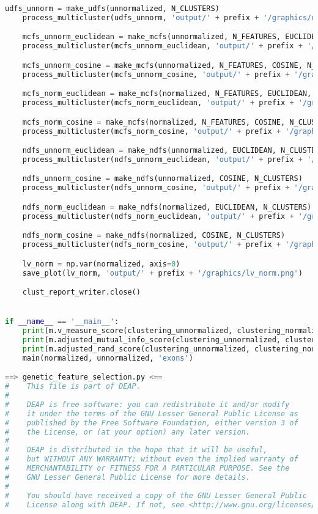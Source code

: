 \begin{lstlisting}[columns=fullflexible,language=Python]
    udfs_unnorm = make_udfs(unnormalized, N_CLUSTERS)
    process_multicluster(udfs_unnorm, 'output/' + prefix + '/graphics/udfs_unnorm_1c.png')

    mcfs_unnorm_euclidean = make_mcfs(unnormalized, N_FEATURES, EUCLIDEAN, N_CLUSTERS)
    process_multicluster(mcfs_unnorm_euclidean, 'output/' + prefix + '/graphics/mcfs_unnorm_euclidean_1c.png')

    mcfs_unnorm_cosine = make_mcfs(unnormalized, N_FEATURES, COSINE, N_CLUSTERS)
    process_multicluster(mcfs_unnorm_cosine, 'output/' + prefix + '/graphics/mcfs_unnorm_cosine_1c.png')

    mcfs_norm_euclidean = make_mcfs(normalized, N_FEATURES, EUCLIDEAN, N_CLUSTERS)
    process_multicluster(mcfs_norm_euclidean, 'output/' + prefix + '/graphics/mcfs_norm_euclidean_1c.png')

    mcfs_norm_cosine = make_mcfs(normalized, N_FEATURES, COSINE, N_CLUSTERS)
    process_multicluster(mcfs_norm_cosine, 'output/' + prefix + '/graphics/mcfs_norm_cosine_1c.png')

    ndfs_unnorm_euclidean = make_ndfs(unnormalized, EUCLIDEAN, N_CLUSTERS)
    process_multicluster(ndfs_unnorm_euclidean, 'output/' + prefix + '/graphics/ndfs_unnorm_euclidean_1c.png')

    ndfs_unnorm_cosine = make_ndfs(unnormalized, COSINE, N_CLUSTERS)
    process_multicluster(ndfs_unnorm_cosine, 'output/' + prefix + '/graphics/ndfs_unnorm_cosine_1c.')

    ndfs_norm_euclidean = make_ndfs(normalized, EUCLIDEAN, N_CLUSTERS)
    process_multicluster(ndfs_norm_euclidean, 'output/' + prefix + '/graphics/ndfs_norm_euclidean_1c.png')

    ndfs_norm_cosine = make_ndfs(normalized, COSINE, N_CLUSTERS)
    process_multicluster(ndfs_norm_cosine, 'output/' + prefix + '/graphics/ndfs_norm_cosine_1c.png')

    lv_norm = np.var(normalized, axis=0)
    save_plot(lv_norm, 'output/' + prefix + '/graphics/lv_norm.png')

    clust_report_writer.close()


if __name__ == '__main__':
    print(m.v_measure_score(clustering_unnormalized, clustering_normalized))
    print(m.adjusted_mutual_info_score(clustering_unnormalized, clustering_normalized))
    print(m.adjusted_rand_score(clustering_unnormalized, clustering_normalized))
    main(normalized, unnormalized, 'exons')

==> genetic_feature_selection.py <==
#    This file is part of DEAP.
#
#    DEAP is free software: you can redistribute it and/or modify
#    it under the terms of the GNU Lesser General Public License as
#    published by the Free Software Foundation, either version 3 of
#    the License, or (at your option) any later version.
#
#    DEAP is distributed in the hope that it will be useful,
#    but WITHOUT ANY WARRANTY; without even the implied warranty of
#    MERCHANTABILITY or FITNESS FOR A PARTICULAR PURPOSE. See the
#    GNU Lesser General Public License for more details.
#
#    You should have received a copy of the GNU Lesser General Public
#    License along with DEAP. If not, see <http://www.gnu.org/licenses/>.



\end{lstlisting}
